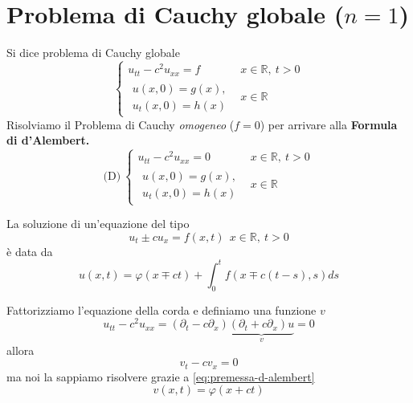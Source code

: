 \documentclass[10pt,a4paper,twoside,openright]{book}
\begin{document}
\section{Problema di Cauchy globale \texorpdfstring{($n=1$)}{(n=1)}}

Si dice problema di Cauchy globale
\begin{equation*}
	\begin{cases}
		u_{tt} -c^{2} u_{xx} =f & x\in \mathbb{R} ,\ t >0 \\
		\begin{array}{l}
		u( x,0) =g( x) ,\\
		u_{t}( x,0) =h( x)
		\end{array}             & x\in \mathbb{R}         
	\end{cases}
\end{equation*}
Risolviamo il Problema di Cauchy \textit{omogeneo} ($f=0$) per arrivare alla \textbf{Formula di d'Alembert.}
\begin{equation*}
	\text{(D)} \ \begin{cases}
	u_{tt} -c^{2} u_{xx} =0 & x\in \mathbb{R} ,\ t >0\\
	\begin{array}{l}
		u( x,0) =g( x) ,   \\
		u_{t}( x,0) =h( x) 
	\end{array} & x\in \mathbb{R}
	\end{cases}
\end{equation*}
\begin{nb}
	[Premessa] La soluzione di un'equazione del tipo
	\begin{equation*}
		u_{t} \pm cu_{x} =f( x,t) \ \ x\in \mathbb{R} ,\ t >0
	\end{equation*}
	è data da
	\begin{equation}
		u( x,t) =\varphi ( x\mp ct) +\int ^{t}_{0} f(x \mp c( t-s) ,s) ds
		\label{eq:premessa-d-alembert}
	\end{equation}
\end{nb}
Fattorizziamo l'equazione della corda e definiamo una funzione $v$
\begin{equation*}
	u_{tt} -c^{2} u_{xx} =( \partial _{t} -c\partial _{x})\underbrace{( \partial _{t} +c\partial _{x}) u}_{v} =0
\end{equation*}
allora
\begin{equation*}
	v_{t} -cv_{x} =0
\end{equation*}
ma noi la sappiamo risolvere grazie a \eqref{eq:premessa-d-alembert}
\begin{equation*}
	v( x,t) =\varphi ( x+ct)
\end{equation*}
\end{document}
